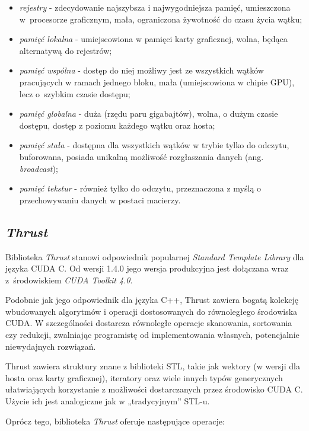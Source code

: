 \documentclass[12pt]{article}
\begin{document}
\begin{itemize}
\item \textit{rejestry} - zdecydowanie najszybsza i najwygodniejsza pamięć, umieszczona w~procesorze graficznym, mała, ograniczona żywotność do czasu życia wątku;
\item \textit{pamięć lokalna} - umiejscowiona w pamięci karty graficznej, wolna, będąca alternatywą do rejestrów;
\item \textit{pamięć wspólna} - dostęp do niej możliwy jest ze wszystkich wątków pracujących w ramach jednego bloku, mała (umiejscowiona w chipie GPU), lecz o~szybkim czasie dostępu;
\item \textit{pamięć globalna} - duża (rzędu paru gigabajtów), wolna, o dużym czasie dostępu, dostęp z poziomu każdego wątku oraz hosta;
\item \textit{pamięć stała} - dostępna dla wszystkich wątków w trybie tylko do odczytu, buforowana, posiada unikalną możliwość rozgłaszania danych (ang. \textit{broadcast});
\item \textit{pamięć tekstur} - również tylko do odczytu, przeznaczona z myślą o przechowywaniu danych w postaci macierzy.
\end{itemize}

\subsection{\textit{Thrust}}

Biblioteka \textit{Thrust} stanowi odpowiednik popularnej \textit{Standard Template Library} dla języka CUDA C. Od wersji 1.4.0 jego wersja produkcyjna jest dołączana wraz z~środowiskiem \textit{CUDA Toolkit 4.0}.

Podobnie jak jego odpowiednik dla języka C++, Thrust zawiera bogatą kolekcję wbudowanych algorytmów i operacji dostosowanych do równoległego środowiska CUDA. W szczególności dostarcza równoległe operacje skanowania, sortowania czy redukcji, zwalniając programistę od implementowania własnych, potencjalnie niewydajnych rozwiązań.

Thrust zawiera struktury znane z biblioteki STL, takie jak wektory (w wersji dla hosta oraz karty graficznej), iteratory oraz wiele innych typów generycznych ułatwiających korzystanie z możliwości dostarczanych przez środowisko CUDA C. Użycie ich jest analogiczne jak w „tradycyjnym” STL-u.

Oprócz tego, biblioteka \textit{Thrust} oferuje następujące operacje:
\end{document}
